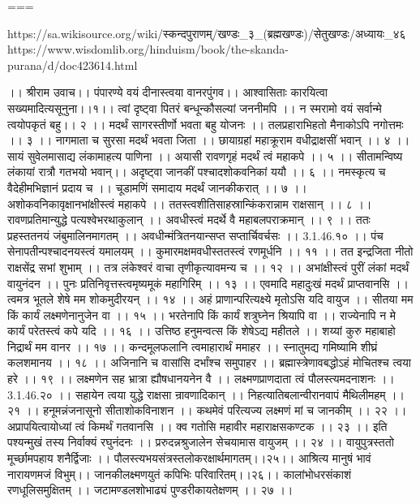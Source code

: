 ===

https://sa.wikisource.org/wiki/स्कन्दपुराणम्/खण्डः_३_(ब्रह्मखण्डः)/सेतुखण्डः/अध्यायः_४६
https://www.wisdomlib.org/hinduism/book/the-skanda-purana/d/doc423614.html

।। श्रीराम उवाच।।
पंपारण्ये वयं दीनास्त्वया वानरपुंगव।।
आश्वासिताः कारयित्वा सख्यमादित्यसूनुना।।१।।
त्वां दृष्ट्वा पितरं बन्धून्कौसल्यां जननीमपि ।।
न स्मरामो वयं सर्वान्मे त्वयोपकृतं बहु।। २ ।।
मदर्थं सागरस्तीर्णो भवता बहु योजनः ।।
तलप्रहाराभिहतो मैनाकोऽपि नगोत्तमः ।। ३ ।।
नागमाता च सुरसा मदर्थं भवता जिता ।।
छायाग्रहां महाक्रूराम वधीद्राक्षसीं भवान् ।। ४ ।।
सायं सुवेलमासाद्य लंकामाहत्य पाणिना ।।
अयासी रावणगृहं मदर्थं त्वं महाकपे ।। ५ ।।
सीतामन्विष्य लंकायां रात्रौ गतभयो भवान्।।
अदृष्ट्वा जानकीं पश्चादशोकवनिकां ययौ ।। ६ ।।
नमस्कृत्य च वैदेहीमभिज्ञानं प्रदाय च ।।
चूडामणिं समादाय मदर्थं जानकीकरात् ।। ७ ।।
अशोकवनिकावृक्षानभांक्षीस्त्वं महाकपे ।।
ततस्त्वशीतिसाहस्रान्किंकरान्नाम राक्षसान् ।। ८ ।।
रावणप्रतिमान्युद्धे पत्यश्वेभरथाकुलान् ।।
अवधीस्त्वं मदर्थे वै महाबलपराक्रमान् ।। ९ ।।
ततः प्रहस्ततनयं जंबुमालिनमागतम् ।।
अवधीन्मंत्रितनयान्सप्त सप्तार्चिवर्चसः ।। 3.1.46.१० ।।
पंच सेनापतीन्पश्चादनयस्त्वं यमालयम् ।।
कुमारमक्षमवधीस्ततस्त्वं रणमूर्धनि ।। ११ ।।
तत इन्द्रजिता नीतो राक्षसेंद्र सभां शुभाम् ।।
तत्र लंकेश्वरं वाचा तृणीकृत्यावमन्य च ।। १२ ।।
अभांक्षीस्त्वं पुरीं लंकां मदर्थं वायुनंदन ।।
पुनः प्रतिनिवृत्तस्त्वमृष्यमूकं महागिरिम् ।। १३ ।।
एवमादि महादुःखं मदर्थं प्राप्तवानसि ।।
त्वमत्र भूतले शेषे मम शोकमुदीरयन् ।। १४ ।।
अहं प्राणान्परित्यक्ष्ये मृतोऽसि यदि वायुज ।।
सीतया मम किं कार्यं लक्ष्मणेनानुजेन वा ।। १५ ।।
भरतेनापि किं कार्यं शत्रुघ्नेन श्रियापि वा ।।
राज्येनापि न मे कार्यं परेतस्त्वं कपे यदि ।। १६ ।।
उत्तिष्ठ हनुमन्वत्स किं शेषेऽद्य महीतले ।।
शय्यां कुरु महाबाहो निद्रार्थं मम वानर ।। १७ ।।
कन्दमूलफलानि त्वमाहारार्थं ममाहर ।।
स्नातुमद्य गमिष्यामि शीघ्रं कलशमानय ।। १८ ।।
अजिनानि च वासांसि दर्भांश्च समुपाहर ।।
ब्रह्मास्त्रेणावबद्धोऽहं मोचितश्च त्वया हरे ।। १९ ।।
लक्ष्मणेन सह भ्रात्रा ह्यौषधानयनेन वै ।।
लक्ष्मणप्राणदाता त्वं पौलस्त्यमदनाशनः ।। 3.1.46.२० ।।
सहायेन त्वया युद्धे राक्षसा न्रावणादिकान् ।।
निहत्यातिबलान्वीरानवापं मैथिलीमहम् ।। २१ ।।
हनूमन्नंजनासूनो सीताशोकविनाशन ।।
कथमेवं परित्यज्य लक्ष्मणं मां च जानकीम् ।। २२ ।।
अप्रापयित्वायोध्यां त्वं किमर्थं गतवानसि ।।
क्व गतोसि महावीर महाराक्षसकण्टक ।। २३ ।।
इति पश्यन्मुखं तस्य निर्वाक्यं रघुनंदनः ।।
प्ररुदन्नश्रुजालेन सेचयामास वायुजम् ।। २४ ।।
वायुपुत्रस्ततो मूर्च्छामपहाय शनैर्द्विजाः ।।
पौलस्त्यभयसंत्रस्तलोकरक्षार्थमागतम्।।२५।।
आश्रित्य मानुषं भावं नारायणमजं विभुम्।।
जानकीलक्ष्मणयुतं कपिभिः परिवारितम्।।२६।।
कालांभोधरसंकाशं रणधूलिसमुक्षितम् ।।
जटामण्डलशोभाढ्यं पुण्डरीकायतेक्षणम् ।। २७ ।।
